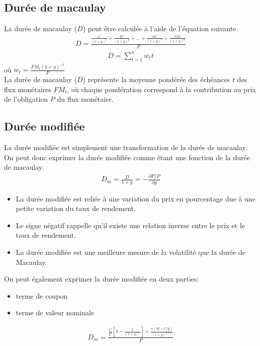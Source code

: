 \documentclass[12pt]{article}
\begin{document}
\subsection{Durée de macaulay}
La durée de macaulay ($D$) peut être calculée à l'aide de l'équation suivante.
\begin{align*}
D=\frac{\frac{C}{(1+y)^1}+\frac{2C}{(1+y)^2}+...+\frac{nC}{(1+y)^{n}}+\frac{nM}{(1+y)^{n}}}{P}
\end{align*}
\begin{align*}
D=\sum_{t=1}^nw_t t
\end{align*}
où $w_t=\frac{FM_t (1+y)^{-t}}{P}$\\


La durée de macaulay ($D$) représente la moyenne pondérée des échéances $t$ des flux monétaires $FM_t$, où chaque pondération correspond à la contribution au prix de l’obligation $P$ du flux monétaire.
\subsection{Durée modifiée}
La durée modifiée est simplement une transformation de la durée de macaulay. On peut donc exprimer la durée modifiée comme étant une fonction de la durée de macaulay.
\begin{align*}
D_m=\frac{D}{1+y}=-\frac{\partial P/P}{\partial y}
\end{align*}
\begin{itemize}
\item La durée modifiée est reliée à une variation du prix en pourcentage due à une petite variation du taux de rendement.  
\item Le signe négatif rappelle qu’il existe une relation inverse entre le prix et le taux de rendement.  
\item La durée modifiée est une meilleure mesure de la volatilité que la durée de Macaulay. 
\end{itemize}
On peut également exprimer la durée modifiée en deux parties:
\begin{itemize}
\item terme de coupon 
\item terme de valeur nominale
\end{itemize}
\begin{align*}
D_m=\frac{\frac{C}{y^2} \left[ 1-\frac{1}{(1+y)^n} \right]+\frac{n(M-C/y)}{(1+y)^{n+1}}}{P}
\end{align*}
\end{document}
